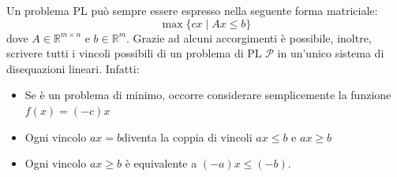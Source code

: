   


Un problema PL può sempre essere espresso nella seguente forma matriciale:
\[
  \max \{cx \mid Ax \leq b\}
\]
dove $ A \in \mathbb{R}^{m \times n} $ e $ b \in \mathbb{R}^m $. Grazie ad alcuni accorgimenti è possibile, inoltre, scrivere tutti i vincoli possibili di un problema di PL $\mathcal{P}$ in un'unico sistema di disequazioni lineari. Infatti:
\begin{itemize}
  \item Se \p è un problema di minimo, occorre considerare semplicemente la funzione $f (x) = (-c)x$
  \item Ogni vincolo $ax = b $diventa la coppia di vincoli $ax \leq b$ e $ax \geq b$
  \item Ogni vincolo $ax \geq b$ è equivalente a $(-a)x \leq (-b)$.
\end{itemize}

